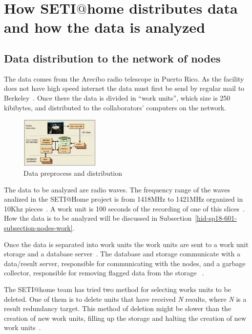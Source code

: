 \section{How SETI$@$home distributes data and how the
data is analyzed}\label{hid-sp18-601-section-howworks}
\subsection{Data distribution to the network
of nodes}\label{hid-sp18-601-subsection-data-dist}
The data comes from the Arecibo radio telescope in Puerto Rico. As the facility
does not have high speed internet the data must first be send by regular mail to
 Berkeley~\cite{hid-sp18-601-www-sathome-howworks}. Once there the data is 
 divided in ``work units'', which size is 250 kibibytes, and distributed to the 
 collaborators' computers on the network.

\begin{figure}[!htb]
        \centering
        \includegraphics[width=0.35\textwidth]{figures/arecibo-to-net.jpg}
        \caption{Data preprocess and
        distribution~\cite{hid-sp18-601-paper-anderson2002seti}}\label{datasend}
\end{figure}

The data to be analyzed are radio waves. The frequency range of the waves 
analized in the SETI$@$Home project is from 1418MHz to 1421MHz organized in 
10Khz pieces~\cite{hid-sp18-601-paper-anderson2002seti}. A work unit is 100 
seconds of the recording of one of this 
slices~\cite{hid-sp18-601-www-sathome-howworks}. How the data is to be analyzed 
will be discussed in Subsection~\ref{hid-sp18-601-subsection-nodes-work}.

Once the data is separated into work units the work units are sent to a work 
unit storage and a database server~\cite{hid-sp18-601-book-foster1999carl}. 
The database and storage communicate with a data/result server, responsible for 
communicating with the nodes, and a garbage collector, responsible for 
removing flagged data from the 
storage
~\cite{hid-sp18-601-book-foster1999carl,hid-sp18-601-paper-anderson2002seti}.

The SETI$@$home team has tried two method for selecting works units to be 
deleted. One of them is to delete units that have received \textit{N} results,
where \textit{N} is a result redundancy target. This method of deletion might 
be slower than the creation of new work units, filling up the storage and 
halting the creation of new work 
units~\cite{hid-sp18-601-paper-anderson2002seti}.

